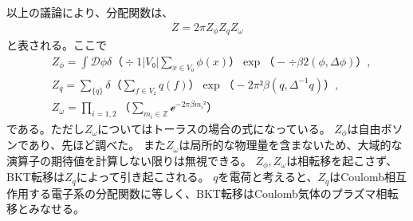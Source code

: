 \documentclass[12pt]{ltjsarticle}
\begin{document}

以上の議論により、分配関数は、
\begin{align}
    Z = 2𝜋 Z_ϕ Z_q Z_ω
\end{align}
と表される。ここで
\begin{align}&
    Z_ϕ = ∫ 𝒟ϕ δ（÷1{|V₀|} ∑_{x ∈ V₀} ϕ(x)） \exp（-÷{β}{2}(ϕ,Δϕ)）, \\
    &
    Z_q =  ∑_{\{q\}}δ（∑_{f ∈ V₂} q(f)）\exp（-2π²β(q,Δ^{-1}q)）, \\
    &
    Z_ω = ∏_{i=1,2}（∑_{m_i ∈ ℤ}ℯ^{-2πβ m_i²}）
\end{align}
である。ただし$Z_ω$についてはトーラスの場合の式になっている。
$Z_ϕ$は自由ボソンであり、先ほど調べた。
また$Z_ω$は局所的な物理量を含まないため、大域的な演算子の期待値を計算しない限りは無視できる。
$Z_ϕ, Z_ω$は相転移を起こさず、BKT転移は$Z_q$によって引き起こされる。
$q$を電荷と考えると、$Z_q$はCoulomb相互作用する電子系の分配関数に等しく、BKT転移はCoulomb気体のプラズマ相転移とみなせる。

\end{document}

